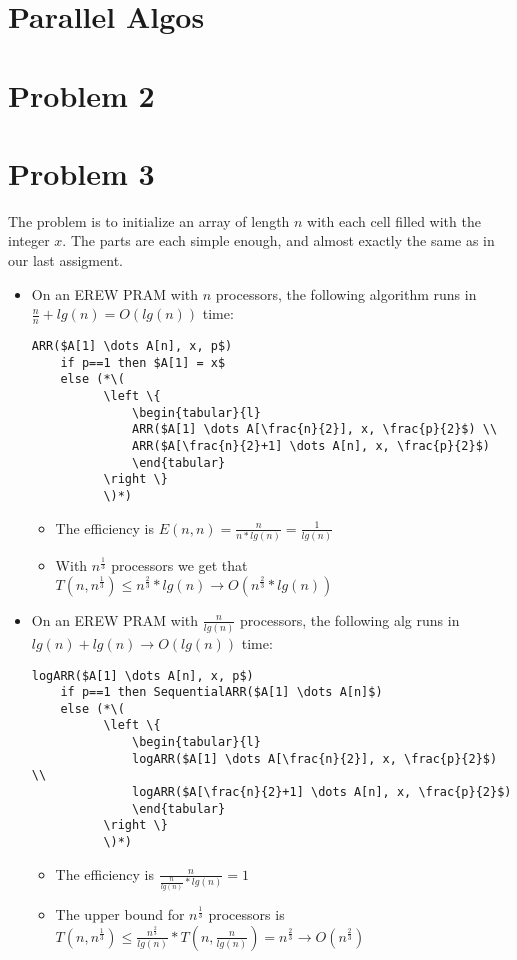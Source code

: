 \documentclass{article}
\providecommand{\prob}[1]{\section*{Problem #1}}
\begin{document}
\pagebreak
\section*{Parallel Algos}
\prob{2}


\prob{3}
The problem is to initialize an array of length $n$ with each cell filled with the integer $x$. The parts are each simple enough, and almost exactly the same as in our last assigment.
\begin{itemize}
  \item On an EREW PRAM with $n$ processors, the following algorithm runs in $\frac{n}{n} + lg(n) = O(lg(n))$ time:
  \begin{lstlisting}
ARR($A[1] \dots A[n], x, p$)
    if p==1 then $A[1] = x$
    else (*\(
          \left \{
              \begin{tabular}{l}
              ARR($A[1] \dots A[\frac{n}{2}], x, \frac{p}{2}$) \\
              ARR($A[\frac{n}{2}+1] \dots A[n], x, \frac{p}{2}$)
              \end{tabular}
          \right \}
          \)*)
  \end{lstlisting}
  \begin{itemize}
    \item The efficiency is $E(n,n) = \frac{n}{n*lg(n)} = \frac{1}{lg(n)}$
    \item With $n^{\frac{1}{3}}$ processors we get that $T(n,n^{\frac{1}{3}}) \leq n^{\frac{2}{3}}*lg(n) \rightarrow O(n^{\frac{2}{3}}*lg(n))$
  \end{itemize}

  \item On an EREW PRAM with $\frac{n}{lg(n)}$ processors, the following alg runs in $lg(n) + lg(n) \rightarrow O(lg(n))$ time:
  \begin{lstlisting}
logARR($A[1] \dots A[n], x, p$)
    if p==1 then SequentialARR($A[1] \dots A[n]$)
    else (*\(
          \left \{
              \begin{tabular}{l}
              logARR($A[1] \dots A[\frac{n}{2}], x, \frac{p}{2}$) \\
              logARR($A[\frac{n}{2}+1] \dots A[n], x, \frac{p}{2}$)
              \end{tabular}
          \right \}
          \)*)
  \end{lstlisting}
  \begin{itemize}
    \item The efficiency is $\frac{n}{\frac{n}{lg(n)}*lg(n)} = 1$
    \item The upper bound for $n^{\frac{1}{3}}$ processors is $T(n,n^{\frac{1}{3}}) \leq \frac{n^{\frac{2}{3}}}{lg(n)}*T(n,\frac{n}{lg(n)}) = n^{\frac{2}{3}} \rightarrow O(n^{\frac{2}{3}})$
  \end{itemize}


\end{itemize}
\end{document}
